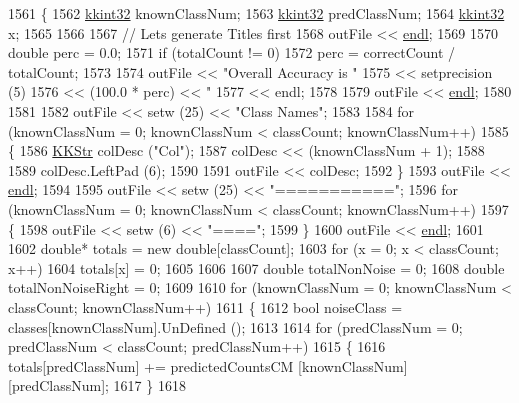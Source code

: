 \begin{DoxyCode}
1561 \{
1562   \hyperlink{namespace_k_k_b_a8fa4952cc84fda1de4bec1fbdd8d5b1b}{kkint32} knownClassNum;
1563   \hyperlink{namespace_k_k_b_a8fa4952cc84fda1de4bec1fbdd8d5b1b}{kkint32} predClassNum;
1564   \hyperlink{namespace_k_k_b_a8fa4952cc84fda1de4bec1fbdd8d5b1b}{kkint32} x;
1565 
1566  
1567   \textcolor{comment}{// Lets generate Titles first}
1568   outFile << \hyperlink{namespace_k_k_b_ad1f50f65af6adc8fa9e6f62d007818a8}{endl};
1569 
1570   \textcolor{keywordtype}{double}  perc = 0.0;
1571   \textcolor{keywordflow}{if}  (totalCount != 0)
1572     perc = correctCount / totalCount;
1573 
1574   outFile  << \textcolor{stringliteral}{"Overall Accuracy is "} 
1575            << setprecision (5)
1576            << (100.0 * perc) << \textcolor{stringliteral}{"%
1577            << endl;
1578 
1579   outFile  << \hyperlink{namespace_k_k_b_ad1f50f65af6adc8fa9e6f62d007818a8}{endl};
1580    
1581 
1582   outFile << setw (25) << \textcolor{stringliteral}{"Class Names"};
1583 
1584   \textcolor{keywordflow}{for}  (knownClassNum = 0;  knownClassNum < classCount;  knownClassNum++)
1585   \{
1586     \hyperlink{class_k_k_b_1_1_k_k_str}{KKStr}  colDesc (\textcolor{stringliteral}{"Col"});
1587     colDesc << (knownClassNum + 1);
1588 
1589     colDesc.LeftPad (6);
1590 
1591     outFile << colDesc;
1592   \}
1593   outFile << \hyperlink{namespace_k_k_b_ad1f50f65af6adc8fa9e6f62d007818a8}{endl};
1594 
1595   outFile << setw (25) << \textcolor{stringliteral}{"==========="};
1596   \textcolor{keywordflow}{for}  (knownClassNum = 0;  knownClassNum < classCount;  knownClassNum++)
1597   \{
1598     outFile << setw (6) << \textcolor{stringliteral}{"===="};
1599   \}
1600   outFile << \hyperlink{namespace_k_k_b_ad1f50f65af6adc8fa9e6f62d007818a8}{endl};
1601 
1602   \textcolor{keywordtype}{double}*  totals = \textcolor{keyword}{new} \textcolor{keywordtype}{double}[classCount];
1603   \textcolor{keywordflow}{for}  (x = 0; x < classCount; x++)
1604     totals[x] = 0;
1605 
1606 
1607   \textcolor{keywordtype}{double}  totalNonNoise = 0;
1608   \textcolor{keywordtype}{double}  totalNonNoiseRight = 0;
1609 
1610   \textcolor{keywordflow}{for}  (knownClassNum = 0;  knownClassNum < classCount;  knownClassNum++)
1611   \{
1612     \textcolor{keywordtype}{bool}  noiseClass = classes[knownClassNum].UnDefined ();
1613 
1614     \textcolor{keywordflow}{for}  (predClassNum = 0; predClassNum < classCount; predClassNum++)
1615     \{
1616       totals[predClassNum] += predictedCountsCM [knownClassNum] [predClassNum];
1617     \}
1618      
}
\end{DoxyCode}
